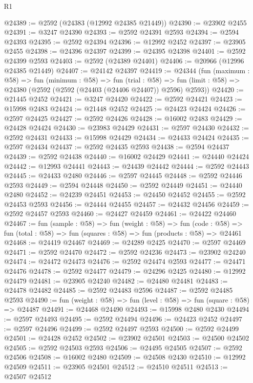 \begin{lexlean}{R1}
\begin{coremodule}
@24389 := @2592 (@24383 (@12992 @24385 @21449))
@24390 := @23902 @2455
@24391 := @3247 @24390
@24393 := @2592 @24391 @2593
@24394 := @2594 @24393
@24395 := @2592 @24394
@24396 := @12992 @2452
@24397 := @23905 @2455
@24398 := @24396 @24397
@24399 := @24395 @24398
@24401 := @2592 @24399 @2593
@24403 := @2592 (@24389 @24401)
@24406 := @20966 (@12996 @24385 @21449)
@24407 := @24142 @24397
@24419 := @24344
    (fun (maximum : @58) =>
    fun (minimum : @58) =>
    fun (trial : @58) =>
    fun (limit : @58) => @24380 (@2592 (@2592 (@24403 (@24406 @24407)) @2596) @2593))
@24420 := @21445 @2452
@24421 := @3247 @24420
@24422 := @2592 @24421
@24423 := @15998 @2483
@24424 := @21448 @2452
@24425 := @24423 @24424
@24426 := @2597 @24425
@24427 := @2592 @24426
@24428 := @16002 @2483
@24429 := @24428 @24424
@24430 := @23983 @24429
@24431 := @2597 @24430
@24432 := @2592 @24431
@24433 := @15998 @24429
@24434 := @24433 @24424
@24435 := @2597 @24434
@24437 := @2592 @24435 @2593
@24438 := @2594 @24437
@24439 := @2592 @24438
@24440 := @16002 @24429
@24441 := @24440 @24424
@24442 := @12993 @24441
@24443 := @24439 @24442
@24444 := @2592 @24443
@24445 := @24433 @2480
@24446 := @2597 @24445
@24448 := @2592 @24446 @2593
@24449 := @2594 @24448
@24450 := @2592 @24449
@24451 := @24440 @2480
@24452 := @24239 @24451
@24453 := @24450 @24452
@24455 := @2592 @24453 @2593
@24456 := @24444 @24455
@24457 := @24432 @24456
@24459 := @2592 @24457 @2593
@24460 := @24427 @24459
@24461 := @24422 @24460
@24467 := fun (sample : @58) =>
  fun (weight : @58) =>
  fun (code : @58) => fun (total : @58) => fun (squares : @58) => fun (products : @58) => @24461
@24468 := @24419 @24467
@24469 := @24289 @2425
@24470 := @2597 @24469
@24471 := @2592 @24470
@24472 := @2592 @24236
@24473 := @23902 @24240
@24474 := @24472 @24473
@24476 := @2592 @24474 @2593
@24477 := @24471 @24476
@24478 := @2592 @24477
@24479 := @24296 @2425
@24480 := @12992 @24479
@24481 := @23905 @24240
@24482 := @24480 @24481
@24483 := @24478 @24482
@24485 := @2592 @24483 @2596
@24487 := @2592 @24485 @2593
@24490 := fun (weight : @58) => fun (level : @58) => fun (square : @58) => @24487
@24491 := @24468 @24490
@24493 := @15998 @2480 @2430
@24494 := @2597 @24493
@24495 := @2592 @24494
@24496 := @24423 @2452
@24497 := @2597 @24496
@24499 := @2592 @24497 @2593
@24500 := @2592 @24499
@24501 := @24428 @2452
@24502 := @23902 @24501
@24503 := @24500 @24502
@24505 := @2592 @24503 @2593
@24506 := @24495 @24505
@24507 := @2592 @24506
@24508 := @16002 @2480
@24509 := @24508 @2430
@24510 := @12992 @24509
@24511 := @23905 @24501
@24512 := @24510 @24511
@24513 := @24507 @24512

\end{coremodule}
\end{lexlean}
